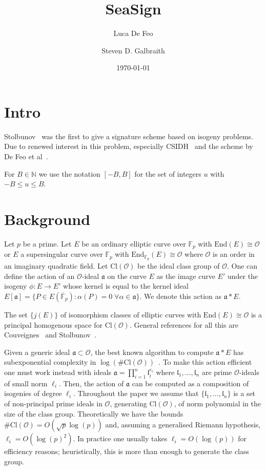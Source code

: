 \documentclass{llncs}
\title{SeaSign}
\author{Luca De Feo \and Steven D. Galbraith}
\institute{Mathematics Department, University of Auckland, NZ.
\email{s.galbraith@auckland.ac.nz}}
\date{\today}
\newcommand{\F}{\mathbb{F}}
\newcommand{\Fpbar}{\overline{\mathbb{F}}_p}
\newcommand{\N}{\mathbb{N}}
\newcommand{\OO}{\mathcal{O}}
\newcommand{\End}{\text{End}}
\newcommand{\Cl}{\text{Cl}}
\renewcommand{\a}{\mathfrak{a}}
\renewcommand{\l}{\mathfrak{l}}
\begin{document}
\pagestyle{plain}

\maketitle


\begin{abstract}

\end{abstract}



\section{Intro}

Stolbunov~\cite{Sto12} was the first to give a signature scheme based on isogeny problems.
Due to renewed interest in this problem, especially CSIDH~\cite{CLMPR18} and the scheme by De Feo et al~\cite{DFKS18}.

For $B \in \N$ we use the notation $[-B,B]$ for the set of integers $u$ with $-B \le u \le B$.

\section{Background}

Let $p$ be a prime.
Let $E$ be an ordinary elliptic curve over $\F_p$ with $\End(E) \cong \OO$ or $E$ a supersingular curve over $\F_p$ with $\End_{\F_p}(E) \cong \OO$ where $\OO$ is an order in an imaginary quadratic field.
Let $\Cl(\OO )$ be the ideal class group of $\OO$.
One can define the action of an $\OO$-ideal $\a$ on the curve $E$ as the image curve $E'$ under the isogeny $\phi : E \to E'$ whose kernel is equal to the kernel ideal $E[ \a ] = \{ P \in E( \Fpbar ) : \alpha(P) = 0 \; \forall \alpha \in \a \}$.
We denote this action as $\a * E$.

The set $\{ j(E) \}$ of isomorphism classes of elliptic curves with $\End(E) \cong \OO$ is a principal homogenous space for $\Cl(\OO )$.
General references for all this are Couveignes~\cite{Couv06}
and Stolbunov~\cite{Sto12}.

Given a generic ideal $\a\subset\OO$, the best known algorithm to compute $\a*E$ has subexponential complexity in $\log(\#\Cl(\OO))$~\cite{JS10}.
To make this action efficient one must work instead with ideals $\a = \prod_{i=1}^n \l_i^{e_i}$ where $\l_1, \dots, \l_n$ are prime $\OO$-ideals of small norm $\ell_i$.
Then, the action of $\a$ can be computed as a composition of isogenies of degree $\ell_i$.
Throughout the paper we assume that $\{ \l_1, \dots, \l_n \}$ is a set of non-principal prime ideals in $\OO$, generating $\Cl(\OO)$, of norm polynomial in the size of the class group.
Theoretically we have the bounds $\#\Cl(\OO) = O( \sqrt{p} \log(p) )$ and, assuming a generalised Riemann hypothesis, $\ell_i = O( \log(p)^2 )$.
In practice one usually takes $\ell_i=O(\log(p))$ for efficiency reasons; heuristically, this is more than enough to generate the class group.
\end{document}
